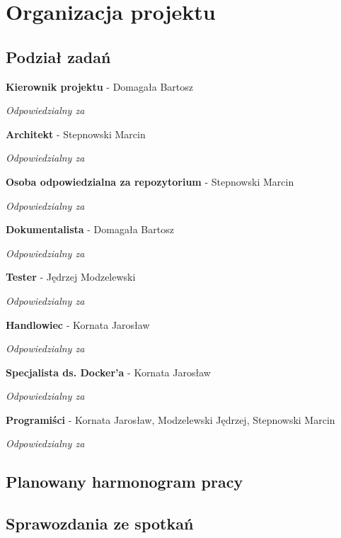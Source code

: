 \chapter{Organizacja projektu}
\section{Podział zadań}

\par{\textbf{Kierownik projektu} - Domagała Bartosz

\textit{Odpowiedzialny za}}

\par{\textbf{Architekt} - Stepnowski Marcin}
\par{\textit{Odpowiedzialny za}}


\par{\textbf{Osoba odpowiedzialna za repozytorium} - Stepnowski Marcin}
\par{\textit{Odpowiedzialny za}}


\par{\textbf{Dokumentalista} - Domagała Bartosz}
\par{\textit{Odpowiedzialny za}}


\par{\textbf{Tester} - Jędrzej Modzelewski}
\par{\textit{Odpowiedzialny za}}


\par{\textbf{Handlowiec} - Kornata Jarosław}
\par{\textit{Odpowiedzialny za}}


\par{\textbf{Specjalista ds. Docker'a} - Kornata Jarosław}
\par{\textit{Odpowiedzialny za}}


\par{\textbf{Programiści} - Kornata Jarosław, Modzelewski Jędrzej, Stepnowski Marcin}
\par{\textit{Odpowiedzialny za}}

\section{Planowany harmonogram pracy}

\par{}

\section{Sprawozdania ze spotkań}

